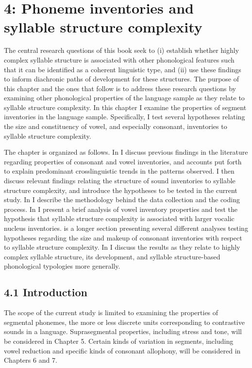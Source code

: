 \chapter{4: Phoneme inventories and syllable structure complexity}

  The central research questions of this book seek to (i) establish whether highly complex syllable structure is associated with other phonological features such that it can be identified as a coherent linguistic type, and (ii) use these findings to inform diachronic paths of development for these structures. The purpose of this chapter and the ones that follow is to address these research questions by examining other phonological properties of the language sample as they relate to syllable structure complexity. In this chapter I examine the properties of segment inventories in the language sample. Specifically, I test several hypotheses relating the size and constituency of vowel, and especially consonant, inventories to syllable structure complexity.

  The chapter is organized as follows. In  I discuss previous findings in the literature regarding properties of consonant and vowel inventories, and accounts put forth to explain predominant crosslinguistic trends in the patterns observed. I then discuss relevant findings relating the structure of sound inventories to syllable structure complexity, and introduce the hypotheses to be tested in the current study. In  I describe the methodology behind the data collection and the coding process. In  I present a brief analysis of vowel inventory properties and test the hypothesis that syllable structure complexity is associated with larger vocalic nucleus inventories.  is a longer section presenting several different analyses testing hypotheses regarding the size and makeup of consonant inventories with respect to syllable structure complexity. In  I discuss the results as they relate to highly complex syllable structure, its development, and syllable structure-based phonological typologies more generally.

\section{4.1 Introduction}

  The scope of the current study is limited to examining the properties of segmental phonemes, the more or less discrete units corresponding to contrastive sounds in a language. Suprasegmental properties, including stress and tone, will be considered in Chapter 5. Certain kinds of variation in segments, including vowel reduction and specific kinds of consonant allophony, will be considered in Chapters 6 and 7.

